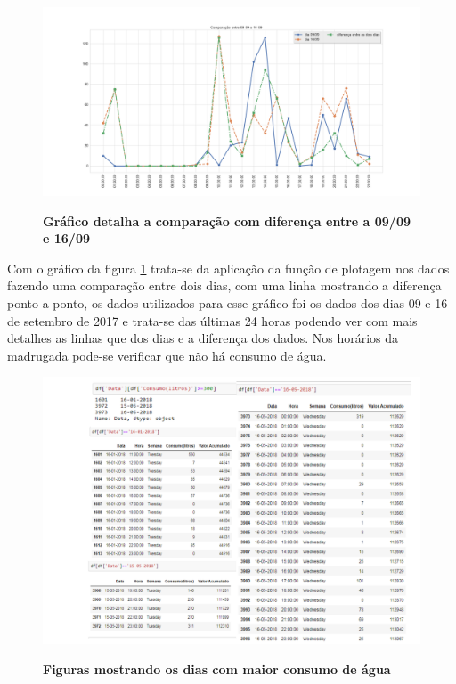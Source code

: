 \begin{figure}[ht]
	\caption{\textbf{Gráfico detalha a comparação com diferença entre a 09/09 e  16/09}}
	\centering
		\includegraphics[width=\textwidth,height=\textheight , keepaspectratio]{figuras/zoomdacomparacaoentresemana03a09-09asemana10a16-09}
		\label{graf_det_semana03a09}
\end{figure}
\par Com o gráfico da figura \ref{graf_det_semana03a09} trata-se da aplicação da função de plotagem nos dados fazendo uma comparação entre dois dias, com uma linha mostrando a diferença ponto a ponto, os dados utilizados para esse gráfico foi os dados dos dias 09 e 16 de setembro de 2017 e trata-se das últimas 24 horas podendo ver com mais detalhes as linhas que dos dias e a diferença dos dados. Nos horários da madrugada pode-se verificar que não há consumo de água.  

\begin{figure}[ht]
	\caption{\textbf{Figuras mostrando os dias com maior consumo de água}}
	\centering
		\includegraphics[width=\textwidth,height=\textheight , keepaspectratio]{figuras/datascommaiorconsumo2}
		\label{fig_maior_consumo}
\end{figure}

